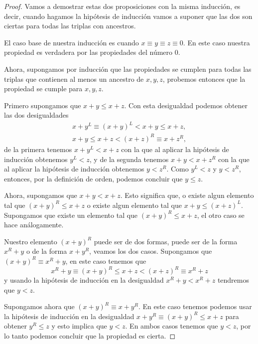     \begin{proof}
        Vamos a demostrar estas dos proposiciones con la misma inducci\'on, es decir, cuando hagamos la hip\'otesis de inducci\'on vamos a suponer que las dos son ciertas para todas las triplas con ancestros.

        El caso base de nuestra inducci\'on es cuando $x\equiv y \equiv z \equiv 0$. En este caso nuestra propiedad es verdadera por las propiedades del n\'umero $0$.

        Ahora, supongamos por inducci\'on que las propiedades se cumplen para todas las triplas que contienen al menos un ancestro de $x,y,z$, probemos entonces que la propiedad se cumple para $x,y,z$.

        Primero supongamos que $x+y\le x+z$. Con esta desigualdad podemos obtener las dos desigualdades
        \begin{align*}
            x+y^L \equiv (x+y)^L < x+y \le x + z,\\
            x+y \le x+z < (x+z)^R \equiv x+z^R,
        \end{align*}
        de la primera tenemos $x + y^L < x + z$ con la que al aplicar la hip\'otesis de inducci\'on obtenemos $y^L < z$, y de la segunda tenemos $x+y < x+z^R$ con la que al aplicar la hip\'otesis de inducci\'on obtenemos $y < z^R$. Como $y^L < z$ y $y < z^R$, entonces, por la definici\'on de orden, podemos concluir que $y \le z$.

        Ahora, supongamos que $x+y < x+z$. Esto significa que, o existe algun elemento tal que $(x+y)^R \le x+z$ o existe algun elemento tal que $x+y \le (x+z)^L$. Supongamos que existe un elemento tal que $(x+y)^R \le x+z$, el otro caso se hace an\'alogamente.

        Nuestro elemento $(x+y)^R$ puede ser de dos formas, puede ser de la forma $x^R+y$ o de la forma $x+y^R$, veamos los dos casos. Supongamos que $(x+y)^R\equiv x^R+y$, en este caso tenemos que
        \[
            x^R+y \equiv (x+y)^R \le x+z < (x+z)^R\equiv x^R + z
        \]
        y usando la hip\'otesis de inducci\'on en la desigualdad $x^R+y < x^R + z$ tendremos que $y < z$.

        Supongamos ahora que $(x+y)^R\equiv x+y^R$. En este caso tenemos podemos usar la hip\'otesis de inducci\'on en la desigualdad $x+y^R \equiv (x+y)^R \le x+z$ para obtener $y^R \le z$ y esto implica que $y < z$. En ambos casos tenemos que $y < z$, por lo tanto podemos concluir que la propiedad es cierta.
    \end{proof}


